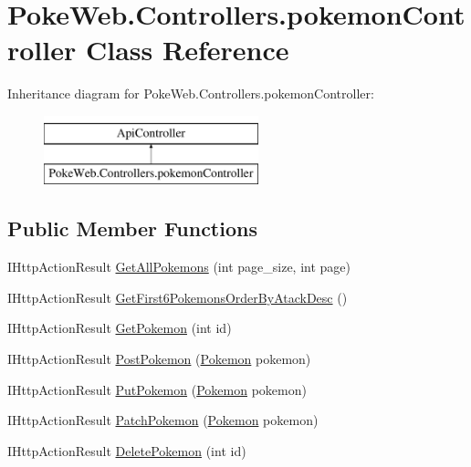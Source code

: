 \hypertarget{class_poke_web_1_1_controllers_1_1pokemon_controller}{}\section{Poke\+Web.\+Controllers.\+pokemon\+Controller Class Reference}
\label{class_poke_web_1_1_controllers_1_1pokemon_controller}
Inheritance diagram for Poke\+Web.\+Controllers.\+pokemon\+Controller\+:\begin{figure}[H]
\begin{center}
\leavevmode
\includegraphics[height=2.000000cm]{class_poke_web_1_1_controllers_1_1pokemon_controller}
\end{center}
\end{figure}
\subsection*{Public Member Functions}
\begin{DoxyCompactItemize}
\item 
I\+Http\+Action\+Result \mbox{\hyperlink{class_poke_web_1_1_controllers_1_1pokemon_controller_a5d8946d4d1cbf4cb9b044ef2e7cb7492}{Get\+All\+Pokemons}} (int page\+\_\+size, int page)
\item 
I\+Http\+Action\+Result \mbox{\hyperlink{class_poke_web_1_1_controllers_1_1pokemon_controller_a631a03b01ec3e0b99e9751c2f9def3bb}{Get\+First6\+Pokemons\+Order\+By\+Atack\+Desc}} ()
\item 
I\+Http\+Action\+Result \mbox{\hyperlink{class_poke_web_1_1_controllers_1_1pokemon_controller_a31ee4aa642842e5fb9a2c1ceaf42f0b6}{Get\+Pokemon}} (int id)
\item 
I\+Http\+Action\+Result \mbox{\hyperlink{class_poke_web_1_1_controllers_1_1pokemon_controller_a426f7fbc4f620f8f7b6f144f10233540}{Post\+Pokemon}} (\mbox{\hyperlink{class_poke_web_1_1_models_1_1_pokemon}{Pokemon}} pokemon)
\item 
I\+Http\+Action\+Result \mbox{\hyperlink{class_poke_web_1_1_controllers_1_1pokemon_controller_a155329861c4235adf1e8ebf27c3fa19e}{Put\+Pokemon}} (\mbox{\hyperlink{class_poke_web_1_1_models_1_1_pokemon}{Pokemon}} pokemon)
\item 
I\+Http\+Action\+Result \mbox{\hyperlink{class_poke_web_1_1_controllers_1_1pokemon_controller_a563cc501f839af2bf76b57b8a8c26dd0}{Patch\+Pokemon}} (\mbox{\hyperlink{class_poke_web_1_1_models_1_1_pokemon}{Pokemon}} pokemon)
\item 
I\+Http\+Action\+Result \mbox{\hyperlink{class_poke_web_1_1_controllers_1_1pokemon_controller_a8ba6862493be8003dc42bebe58578da4}{Delete\+Pokemon}} (int id)
\end{DoxyCompactItemize}



